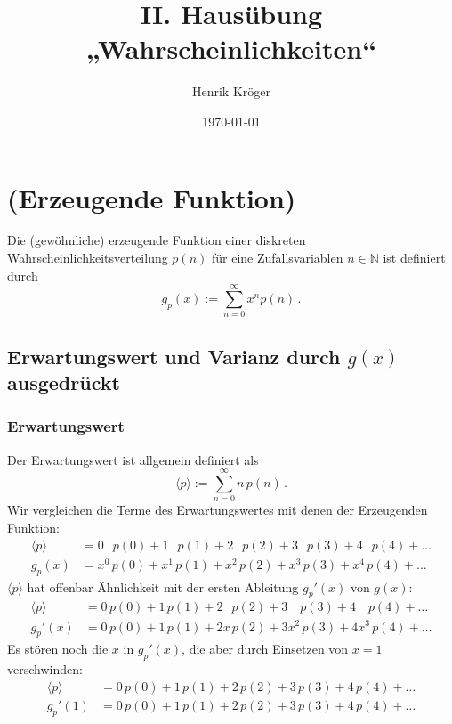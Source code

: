 \documentclass[a4paper]{article}
\title{II. Hausübung „Wahrscheinlichkeiten“}
\author{Henrik Kröger}
\date{\today}
\begin{document}
\maketitle

\section{(Erzeugende Funktion)}
Die (gewöhnliche) erzeugende Funktion
einer diskreten Wahrscheinlichkeitsverteilung $p(n)$
für eine Zufallsvariablen $n\in\mathbb{N}$ ist definiert durch
\begin{equation}
    g_p(x) := \sum_{n=0}^{\infty} x^n p(n) \label{eq:erzeugende} \,.
\end{equation}

\subsection{Erwartungswert und Varianz durch $g(x)$ ausgedrückt}
\subsubsection{Erwartungswert}
Der Erwartungswert ist allgemein definiert als
\begin{equation}
    \langle p \rangle := \sum_{n=0}^{\infty} n \, p(n) \,.
\end{equation}
Wir vergleichen die Terme des Erwartungswertes mit denen der Erzeugenden Funktion:
\begin{align*}
    \langle p \rangle &= 0\;\;\,p(0)   + 1\;\;\,p(1) + 2\;\;\,p(2) + 3\;\;\,p(3) + 4\;\;\,p(4) + \ldots \\
    g_p(x)            &= x^0\,p(0) + x^1\,p(1) + x^2\,p(2) + x^3\,p(3) + x^4\,p(4) + \ldots
\end{align*}
$\langle p \rangle$ hat offenbar Ähnlichkeit mit der ersten Ableitung $g_p'(x)$ von $g(x)$:
\begin{align*}
    \langle p \rangle &= 0\,p(0) + 1\,p(1) + 2\;\;\,p(2) + 3\;\;\;\,p(3) + 4\;\;\;\,p(4) + \ldots \\
    g_p'(x)           &= 0\,p(0) + 1\,p(1) + 2x\,p(2) +    3x^2\,p(3)    + 4x^3\,p(4) + \ldots
\end{align*}
Es stören noch die $x$ in $g_p'(x)$, die aber durch Einsetzen von $x=1$ verschwinden:
\begin{align*}
    \langle p \rangle &= 0\,p(0) + 1\,p(1) + 2\,p(2) + 3\,p(3) + 4\,p(4) + \ldots \\
    g_p'(1)           &= 0\,p(0) + 1\,p(1) + 2\,p(2) + 3\,p(3) + 4\,p(4) + \ldots \\
\end{align*}
\end{document}
